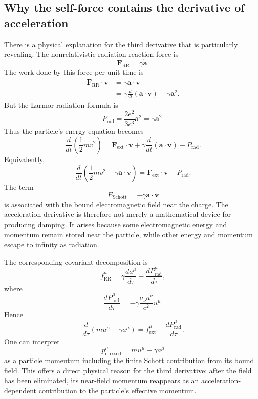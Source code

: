 \subsection{ Why the self-force contains the derivative of acceleration}
There is a physical explanation for the third derivative that is particularly
revealing.
The nonrelativistic radiation-reaction force is
\[
\mathbf F_{\mathrm{RR}}=\gamma\dot{\mathbf a}.
\]
The work done by this force per unit time is
\[
\begin{aligned}
\mathbf F_{\mathrm{RR}}\cdot\mathbf v
&=\gamma\dot{\mathbf a}\cdot\mathbf v\\
&=\gamma\frac{d}{dt}(\mathbf a\cdot\mathbf v)
-\gamma\mathbf a^2.
\end{aligned}
\]
But the Larmor radiation formula is
\[
P_{\mathrm{rad}}
=
\frac{2e^2}{3c^3}\mathbf a^2
=\gamma\mathbf a^2.
\]
Thus the particle's energy equation becomes
\[
\frac{d}{dt}\left(\frac12mv^2\right)
=
\mathbf F_{\mathrm{ext}}\cdot\mathbf v
+\gamma\frac{d}{dt}(\mathbf a\cdot\mathbf v)
-P_{\mathrm{rad}}.
\]
Equivalently,
\[
\boxed{
\frac{d}{dt}
\left(
\frac12mv^2-\gamma\mathbf a\cdot\mathbf v
\right)
=
\mathbf F_{\mathrm{ext}}\cdot\mathbf v
-P_{\mathrm{rad}}.
}
\]
The term
\[
E_{\mathrm{Schott}}=-\gamma\mathbf a\cdot\mathbf v
\]
is associated with the bound electromagnetic field near the charge.
The acceleration derivative is therefore not merely a mathematical device for producing damping. It arises because some electromagnetic energy and momentum remain stored near the particle, while other energy and momentum escape to infinity as radiation.

The corresponding covariant decomposition is
\[
f_{\mathrm{RR}}^\mu
=
\gamma\frac{da^\mu}{d\tau}
-
\frac{dP_{\mathrm{rad}}^\mu}{d\tau},
\]
where
\[
\frac{dP_{\mathrm{rad}}^\mu}{d\tau}
=
-\gamma\frac{a_\nu a^\nu}{c^2}u^\mu.
\]
Hence
\[
\frac{d}{d\tau}
\left(mu^\mu-\gamma a^\mu\right)
=
f_{\mathrm{ext}}^\mu
-\frac{dP_{\mathrm{rad}}^\mu}{d\tau}.
\]
One can interpret
\[
p_{\mathrm{dressed}}^\mu=mu^\mu-\gamma a^\mu
\]
as a particle momentum including the finite Schott contribution from its bound
field.
This offers a direct physical reason for the third derivative: after the field
has been eliminated, its near-field momentum reappears as an
acceleration-dependent contribution to the particle's effective momentum.

